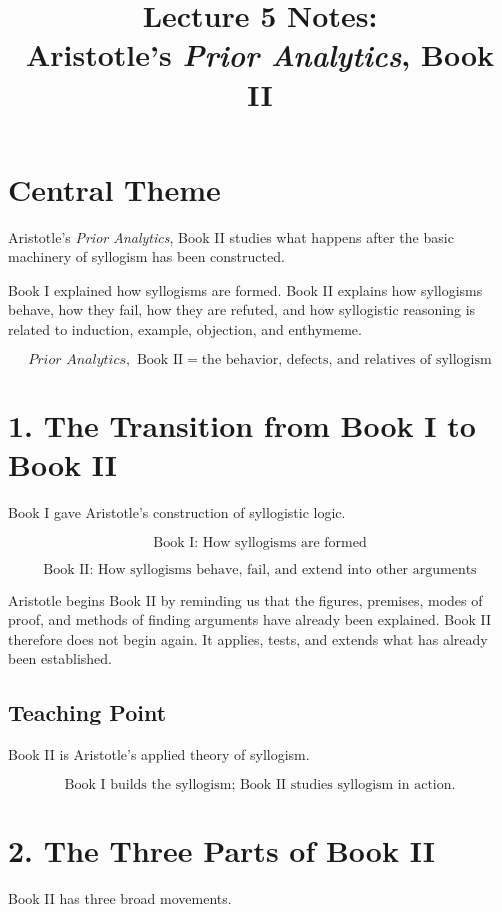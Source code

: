 \documentclass[12pt]{article}
\title{Lecture 5 Notes: \\ Aristotle's \textit{Prior Analytics}, Book II}
\author{}
\date{}
\begin{document}
\maketitle

\section*{Central Theme}

Aristotle's \textit{Prior Analytics}, Book II studies what happens after the
basic machinery of syllogism has been constructed.

Book I explained how syllogisms are formed. Book II explains how syllogisms
behave, how they fail, how they are refuted, and how syllogistic reasoning is
related to induction, example, objection, and enthymeme.

\[
\boxed{
\textit{Prior Analytics}, \text{ Book II}
=
\text{the behavior, defects, and relatives of syllogism}
}
\]

\section*{1. The Transition from Book I to Book II}

Book I gave Aristotle's construction of syllogistic logic.

\[
\text{Book I: How syllogisms are formed}
\]

\[
\text{Book II: How syllogisms behave, fail, and extend into other arguments}
\]

Aristotle begins Book II by reminding us that the figures, premises, modes of
proof, and methods of finding arguments have already been explained. Book II
therefore does not begin again. It applies, tests, and extends what has already
been established.

\subsection*{Teaching Point}

Book II is Aristotle's applied theory of syllogism.

\[
\boxed{
\text{Book I builds the syllogism; Book II studies syllogism in action.}
}
\]

\section*{2. The Three Parts of Book II}

Book II has three broad movements.
\end{document}
